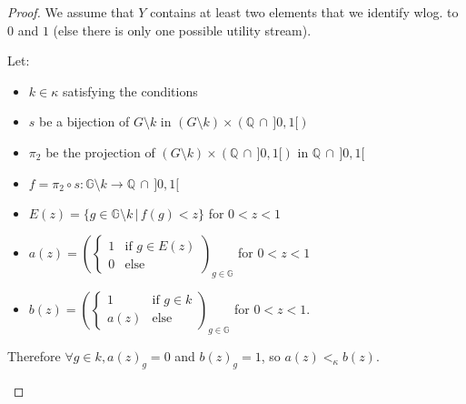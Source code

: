 \documentclass{article}
\begin{document}
\begin{proof}
  We assume that $Y$ contains at least two elements that we identify wlog. to $0$
  and $1$ (else there is only one possible utility stream).

  Let:
  \begin{itemize}
  \item $k\in\kappa$ satisfying the conditions
  \item $s$ be a bijection of $G\setminus k$ in $(G\setminus k)\times
        (\mathbb Q\,\cap\,]0,1[)$
  \item $\pi_2$ be the projection of $(G\setminus k)\times (\mathbb Q\,\cap\,]0,1[)$
        in $\mathbb Q\,\cap\,]0,1[$
  \item $f=\pi_2\circ s:\mathbb G\setminus k\to\mathbb Q\,\cap\,]0,1[$
  \item $E(z)=\{g\in \mathbb G\setminus k\,|\, f(g)<z\}$ for $0<z<1$
  \item $\displaystyle a(z)=\left(\left\{\begin{array}{ll}1&\text{if }g\in
        E(z)\\0&\text{else}\end{array}\right.\right)_{g\in\mathbb G}$ for $0<z<1$
  \item $\displaystyle b(z)=\left(\left\{\begin{array}{ll}1&\text{if }g\in
        k\\a(z)&\text{else}\end{array}\right.\right)_{g\in\mathbb G}$ for $0<z<1$.
  \end{itemize}

  Therefore $\forall g\in k, a(z)_g=0$ and $b(z)_g=1$, so $a(z)<_\kappa b(z)$.

  \begin{center}
  \end{center}


\end{proof}
\end{document}
